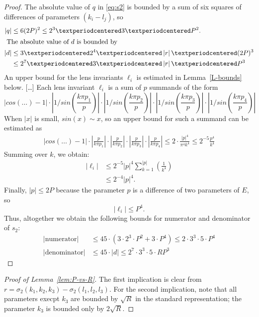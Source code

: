 \documentclass{article}
\newcommand{\abs}[1]{\left|#1\right|}
\begin{document}
\begin{proof}
The absolute value of \(q\) in \eqref{eq:s2} is bounded by a sum of six squares of differences of parameters \((k_i-l_j)\), so 
\begin{align}
  \abs{q}&\leq 6(2P)^2 \leq 2^3·3·P^2.\\
  \intertext{
  The absolute value of \(d\) is bounded by}
  \notag 
  \abs{d} &\leq 3 · 2^4 · \abs{r} · (2P)^3\\
         &\leq 2^7·3·\abs{r} · P^3
\end{align}
An upper bound for the lens invariants \(\ell_i\) is estimated in Lemma~\ref{L-bounds} below. [\dots]
{\color{gray} Each lens invariant \(\ell_i\) is a sum of \(p\) summands of the form
\[
  \abs{cos(…)-1}
  ·\abs{1/sin\left(\frac{k\pi p_1}{p}\right)}
  ·\abs{1/sin\left(\frac{k\pi p_2}{p}\right)}
  ·\abs{1/sin\left(\frac{k\pi p_3}{p}\right)}
  ·\abs{1/sin\left(\frac{k\pi p_4}{p}\right)}
\]
When \(\abs{x}\) is small, \(sin(x) \sim x\), so an upper bound for such a summand can be estimated as
\begin{align*}
   \abs{cos(…)-1}
    ·\abs{\frac{p}{k\pi p_1}}
    ·\abs{\frac{p}{k\pi p_2}}
    ·\abs{\frac{p}{k\pi p_3}}
    ·\abs{\frac{p}{k\pi p_4}}
 \leq 2·\frac{\abs{p}^4}{\pi^4k^4}
  \leq 2^{-5} \frac{p^4}{k^4} 
\end{align*}
Summing over \(k\), we obtain:
\begin{align*}
  \abs{\ell_i} 
  &\leq 2^{-5}\abs{p}^4 \sum_{k=1}^{\abs{p}}\left(\frac{1}{k^4}\right)\\
  &\leq 2^{-4}\abs{p}^4.
\end{align*}
Finally, \(\abs{p}\leq 2P\)  because the parameter \(p\) is a difference of two parameters of \(E\), so
\begin{equation}
\abs{\ell_i} \leq P^4 .
\end{equation}
}
Thus, altogether we obtain the following bounds for numerator and denominator of \(s_2\):
\begin{align*}
  \abs{\text{numerator}} &\leq 45·(3·2^3·P^2 + 3·P^4) \leq 2·3^3·5·P^4\\
  \abs{\text{denominator}} &\leq 45·\abs{d} \leq 2^7·3^3·5· R P^3
\end{align*}
\end{proof}

\begin{proof}[Proof of Lemma~\ref{lem:P-vs-R}]
The first implication is clear from \(r = \sigma_2(k_1,k_2,k_3) - \sigma_2(l_1,l_2,l_3)\).
For the second implication, note that all parameters execpt \(k_3\) are bounded by \(\sqrt{R}\) in the standard representation; the parameter \(k_3\) is bounded only by \(2\sqrt{R}\).
\end{proof}
\end{document}
